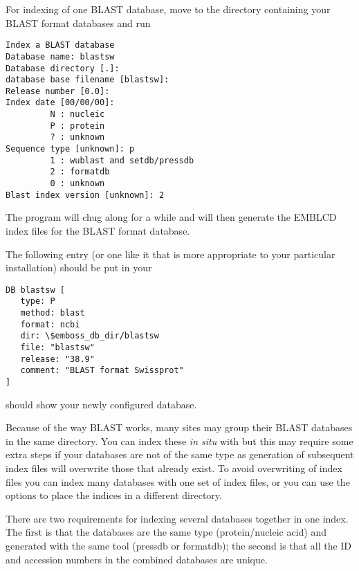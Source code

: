 \documentclass{report}
\begin{document}
\begin{comment}At present \EMBOSS
will only index BLAST databases created from FASTA format input files
with one of the recognised header formats.  More information on the
relevant formats can be found in subsection \ref{subsec:fasta}
below.
\end{comment}

For indexing of one BLAST database, move to the
directory containing your BLAST format databases and run

\begin{verbatim}
Index a BLAST database
Database name: blastsw
Database directory [.]: 
database base filename [blastsw]: 
Release number [0.0]: 
Index date [00/00/00]: 
         N : nucleic
         P : protein
         ? : unknown
Sequence type [unknown]: p
         1 : wublast and setdb/pressdb
         2 : formatdb
         0 : unknown
Blast index version [unknown]: 2

\end{verbatim}

The program will chug along for a while and will then generate the
EMBLCD index files for the BLAST format database.

The following entry (or one like it that is more appropriate to your
particular installation) should be put in your 

\begin{verbatim}
DB blastsw [
   type: P
   method: blast
   format: ncbi
   dir: \$emboss_db_dir/blastsw
   file: "blastsw"
   release: "38.9"
   comment: "BLAST format Swissprot"
]
\end{verbatim}

 should show your newly configured database.

Because of the way BLAST works, many sites may group their BLAST
databases in the same directory. You can index these {\it in situ}
with  but this may require some extra steps if your
databases are not of the same type as generation of subsequent index
files will overwrite those that already exist. To avoid overwriting of
index files you can index many databases with one set of index files,
or you can use the  options to place the indices in a
different directory.

There are two requirements for indexing several databases together in
one index. The first is that the databases are the same type
(protein/nucleic acid) and generated with the same tool (pressdb or
formatdb); the second is that all the ID and accession numbers in the
combined databases are unique.
\end{document}
